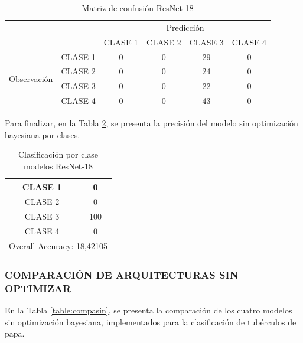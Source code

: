 	\begin{table}[htbp]
		\centering
		\begin{tabular}{|c|l|c|c|c|c|}
			\hline
			\multicolumn{2}{|c|}{\multirow{2}[4]{*}{}} & \multicolumn{4}{c|}{Predicción} \bigstrut\\
			\cline{3-6}    \multicolumn{2}{|c|}{} & CLASE 1 & CLASE 2 & CLASE 3 & CLASE 4 \bigstrut\\
			\hline
			\multirow{4}[8]{*}{\begin{sideways}Observación\end{sideways}} & CLASE 1 & 0     & 0     & 29    & 0 \bigstrut\\
			\cline{2-6}          & CLASE 2 & 0     & 0     & 24    & 0 \bigstrut\\
			\cline{2-6}          & CLASE 3 & 0     & 0     & 22    & 0 \bigstrut\\
			\cline{2-6}          & CLASE 4 & 0     & 0     & 43    & 0 \bigstrut\\
			\hline
		\end{tabular}%
		\caption{Matriz de confusión ResNet-18}
		\label{MC_RESNET18}
	\end{table}%
	
	Para finalizar, en la Tabla \ref*{clase_RESNET18}, se presenta la precisión del modelo sin optimización bayesiana por clases.
	
		\begin{table}[htbp]
		\centering
		\begin{tabular}{|c|c|}
			\hline
			CLASE 1 & 0 \bigstrut\\
			\hline
			CLASE 2 & 0 \bigstrut\\
			\hline
			CLASE 3 & 100 \bigstrut\\
			\hline
			CLASE 4 & 0 \bigstrut\\
			\hline
			\multicolumn{2}{|c|}{Overall Accuracy: 18,42105} \bigstrut\\
			\hline
		\end{tabular}%
		\caption{Clasificación por clase modelos ResNet-18}
		\label{clase_RESNET18}
	\end{table}%


	\newpage	
	\subsubsection{\MakeUppercase{Comparación de arquitecturas sin optimizar}}
	En la Tabla \ref{table:compasin}, se presenta la comparación de los cuatro modelos sin optimización bayesiana, implementados para la clasificación de tubérculos de papa.
	

